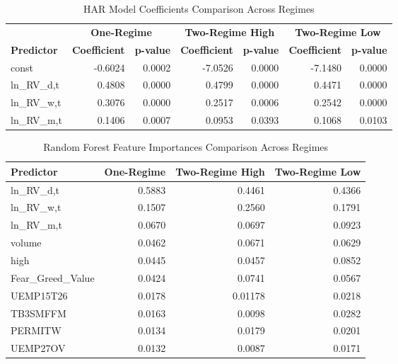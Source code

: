 \documentclass{article}
\begin{document}
\begin{table}[htbp]
\centering
\caption{HAR Model Coefficients Comparison Across Regimes}
\label{tab:har_coefficients_comparison}
\begin{tabular}{lrrrrrr}
\toprule
 {} & \multicolumn{2}{c}{\textbf{One-Regime}} & \multicolumn{2}{c}{\textbf{Two-Regime High}} & \multicolumn{2}{c}{\textbf{Two-Regime Low}} \\
\cmidrule(lr){2-3} \cmidrule(lr){4-5} \cmidrule(lr){6-7}
                           {\textbf{Predictor}} & \textbf{Coefficient} & \textbf{p-value}   & \textbf{Coefficient} & \textbf{p-value}   & \textbf{Coefficient} & \textbf{p-value}   \\
\midrule
const          & -0.6024   & 0.0002    & -7.0526    & 0.0000    & -7.1480    & 0.0000    \\
ln\_RV\_d,t    & 0.4808    & 0.0000    & 0.4799     & 0.0000    & 0.4471     & 0.0000    \\
ln\_RV\_w,t    & 0.3076    & 0.0000    & 0.2517     & 0.0006    & 0.2542     & 0.0000    \\
ln\_RV\_m,t    & 0.1406    & 0.0007    & 0.0953     & 0.0393    & 0.1068     & 0.0103    \\
\bottomrule
\end{tabular}
\end{table}

\begin{table}[htbp]
\centering
\caption{Random Forest Feature Importances Comparison Across Regimes}
\label{tab:rf_feature_importances_comparison}
\begin{tabular}{lrrr}
\toprule
\textbf{Predictor}         & \multicolumn{1}{c}{\textbf{One-Regime}} & \multicolumn{1}{c}{\textbf{Two-Regime High}} & \multicolumn{1}{c}{\textbf{Two-Regime Low}} \\
\midrule
ln\_RV\_d,t       & 0.5883 & 0.4461 & 0.4366 \\
ln\_RV\_w,t       & 0.1507 & 0.2560 & 0.1791 \\
ln\_RV\_m,t       & 0.0670 & 0.0697 & 0.0923 \\
volume            & 0.0462 & 0.0671 & 0.0629 \\
high              & 0.0445 & 0.0457 & 0.0852     \\
Fear\_Greed\_Value & 0.0424 & 0.0741 & 0.0567 \\
UEMP15T26         & 0.0178 & 0.01178 & 0.0218 \\
TB3SMFFM          & 0.0163 & 0.0098 & 0.0282 \\
PERMITW           & 0.0134 & 0.0179 & 0.0201 \\
UEMP27OV          & 0.0132 & 0.0087 & 0.0171 \\
\bottomrule
\end{tabular}
\end{table}
\end{document}
